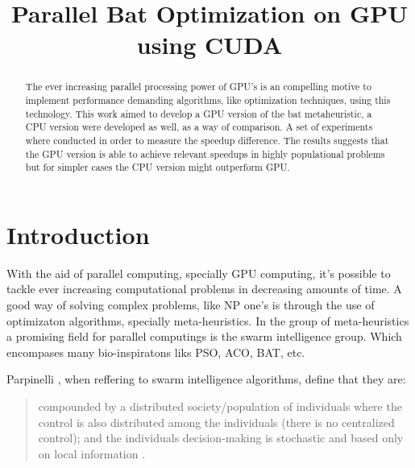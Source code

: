 \documentclass[conference]{IEEEtran}
\begin{document}
\title{Parallel Bat Optimization on GPU using CUDA}

\author{
\and
{}
}

\maketitle
\begin{abstract}
The ever increasing parallel processing power of GPU's is an compelling
motive to implement performance demanding algorithms, like optimization
techniques, using this technology. This work aimed to develop a GPU
version of the bat metaheuristic, a CPU version were developed as well,
as a way of comparison. A set of experiments where conducted in order
to measure the speedup difference. The results suggests that the GPU
version is able to achieve relevant speedups in highly populational
problems but for simpler cases the CPU version might outperform GPU.
\end{abstract}
\IEEEpeerreviewmaketitle

\section{Introduction}%

With the aid of parallel computing, specially GPU computing, it's
possible to tackle ever increasing computational problems in decreasing amounts of time.
A good way of solving complex problems, like NP one's is through the use
of optimizaton algorithms, specially meta-heuristics. In the group of
meta-heuristics a promising field for parallel computings is the swarm
intelligence group. Which encompases many bio-inspiratons liks PSO, ACO,
BAT, etc.

Parpinelli \cite{newInspirations}, when reffering to swarm
intelligence algorithms, define that they are: \begin{quote} compounded by a distributed
society/population of individuals where the control is also
distributed among the individuals (there is no centralized control);
and the individuals decision-making is stochastic and based only on
local information .\end{quote}
\end{document}
